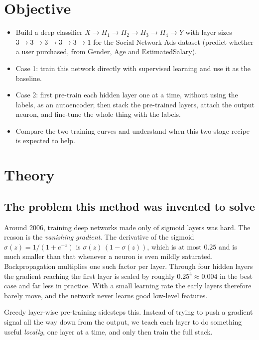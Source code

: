 \documentclass[12pt]{article}
\begin{document}
\section{Objective}

\begin{itemize}
\item Build a deep classifier
      $X \rightarrow H_1 \rightarrow H_2 \rightarrow H_3 \rightarrow H_4
      \rightarrow Y$ with layer sizes $3\to3\to3\to3\to3\to1$ for the
      Social Network Ads dataset (predict whether a user purchased, from
      Gender, Age and EstimatedSalary).
\item Case 1: train this network directly with supervised learning and use it
      as the baseline.
\item Case 2: first pre-train each hidden layer one at a time, without using the
      labels, as an autoencoder; then stack the pre-trained layers, attach the
      output neuron, and fine-tune the whole thing with the labels.
\item Compare the two training curves and understand when this two-stage recipe
      is expected to help.
\end{itemize}

\section{Theory}

\subsection{The problem this method was invented to solve}

Around 2006, training deep networks made only of sigmoid layers was hard. The
reason is the \emph{vanishing gradient}. The derivative of the sigmoid
$\sigma(z) = 1/(1+e^{-z})$ is $\sigma(z)\,(1-\sigma(z))$, which is at most
$0.25$ and is much smaller than that whenever a neuron is even mildly saturated.
Backpropagation multiplies one such factor per layer. Through four hidden
layers the gradient reaching the first layer is scaled by roughly
$0.25^4 \approx 0.004$ in the best case and far less in practice. With a small
learning rate the early layers therefore barely move, and the network never
learns good low-level features.

Greedy layer-wise pre-training sidesteps this. Instead of trying to push a
gradient signal all the way down from the output, we teach each layer to do
something useful \emph{locally}, one layer at a time, and only then train the
full stack.
\end{document}
